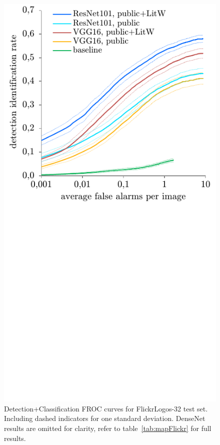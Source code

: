 \documentclass[a4paper,twoside]{article}
\begin{document}
\begin{figure}%
\centering%
\includegraphics[width=\linewidth, trim=0cm 7cm 0cm 0cm, clip]{img/classificationFroc.pdf}%
\caption{Detection+Classification FROC curves for FlickrLogos-32 test set. Including dashed indicators for one standard deviation. DenseNet results are omitted for clarity, refer to table~\ref{tab:mapFlickr} for full results.}%
\label{fig:classificationFroc}
\end{figure}%
\end{document}
